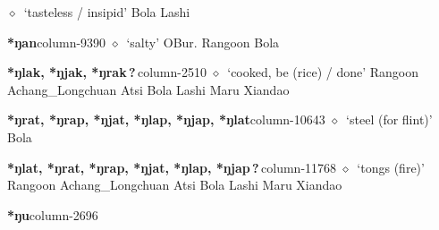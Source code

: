          $\diamond$~`tasteless / insipid'
         Bola 
\hspace{1ex}
         Lashi 
  \item {\footnotesize \textbf{*ŋan}}{\tiny column-9390}
         $\diamond$~`salty'
         OBur. 
\hspace{1ex}
         Rangoon 
\hspace{1ex}
         Bola 
  \item {\footnotesize \textbf{*ŋlak, *ŋjak, *ŋrak\,?\,}}{\tiny column-2510}
         $\diamond$~`cooked, be (rice) / done'
         Rangoon 
\hspace{1ex}
         Achang\_Longchuan 
\hspace{1ex}
         Atsi 
\hspace{1ex}
         Bola 
\hspace{1ex}
         Lashi 
\hspace{1ex}
         Maru 
\hspace{1ex}
         Xiandao 
  \item {\footnotesize \textbf{*ŋrat, *ŋrap, *ŋjat, *ŋlap, *ŋjap, *ŋlat}}{\tiny column-10643}
         $\diamond$~`steel (for flint)'
         Bola 
  \item {\footnotesize \textbf{*ŋlat, *ŋrat, *ŋrap, *ŋjat, *ŋlap, *ŋjap\,?\,}}{\tiny column-11768}
         $\diamond$~`tongs (fire)'
         Rangoon 
\hspace{1ex}
         Achang\_Longchuan 
\hspace{1ex}
         Atsi 
\hspace{1ex}
         Bola 
\hspace{1ex}
         Lashi 
\hspace{1ex}
         Maru 
\hspace{1ex}
         Xiandao 
  \item {\footnotesize \textbf{*ŋu}}{\tiny column-2696}
